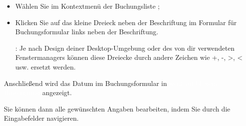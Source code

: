 \begin{itemize}
	\item Wählen Sie im Kontextmenü der Buchungsliste ;
	\item Klicken Sie auf das kleine Dreieck neben der Beschriftung  im Formular für Buchungsformular links neben der Beschriftung.
	
	\Note{}: Je nach Design deiner Desktop-Umgebung oder des von dir verwendeten Fenstermanagers können diese Dreiecke durch andere Zeichen wie +, -, >, < usw. ersetzt werden.
\end{itemize}

Anschließend wird das Datum im Buchungsformular in {\setlength{\fboxsep}{2pt}\colorbox[RGB]{61,174,233}{\textcolor{white}{\textsf{weiß auf blauem Hintergrund}}}} angezeigt.

Sie können dann alle gewünschten Angaben bearbeiten, indem Sie durch die Eingabefelder navigieren.

